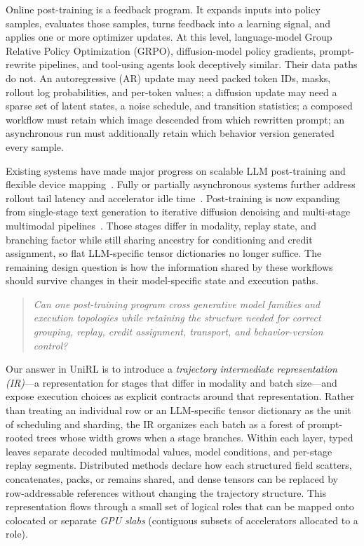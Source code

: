 \documentclass[10pt]{article}
\begin{document}
Online post-training is a feedback program.
It expands inputs into policy samples, evaluates those samples, turns feedback into a learning signal, and applies one or more optimizer updates.
At this level, language-model Group Relative Policy Optimization (GRPO), diffusion-model policy gradients, prompt-rewrite pipelines, and tool-using agents look deceptively similar.
Their data paths do not.
An autoregressive (AR) update may need packed token IDs, masks, rollout log probabilities, and per-token values; a diffusion update may need a sparse set of latent states, a noise schedule, and transition statistics; a composed workflow must retain which image descended from which rewritten prompt; an asynchronous run must additionally retain which behavior version generated every sample.

Existing systems have made major progress on scalable LLM post-training and flexible device mapping~\citep{sheng2024hybridflow,hu2024openrlhf,wang2025roll,nemorl2025}.
Fully or partially asynchronous systems further address rollout tail latency and accelerator idle time~\citep{fu2025areal,zhang2026relax,slime2025}.
Post-training is now expanding from single-stage text generation to iterative diffusion denoising and multi-stage multimodal pipelines~\citep{black2023ddpo,liu2025flowgrpo,xue2025dancegrpo,zheng2025diffusionnft,verlomni2026}.
Those stages differ in modality, replay state, and branching factor while still sharing ancestry for conditioning and credit assignment, so flat LLM-specific tensor dictionaries no longer suffice.
The remaining design question is how the information shared by these workflows should survive changes in their model-specific state and execution paths.

\begin{quote}
\emph{Can one post-training program cross generative model families and execution topologies while retaining the structure needed for correct grouping, replay, credit assignment, transport, and behavior-version control?}
\end{quote}

Our answer in UniRL is to introduce a \emph{trajectory intermediate representation (IR)}---a representation for stages that differ in modality and batch size---and expose execution choices as explicit contracts around that representation.
Rather than treating an individual row or an LLM-specific tensor dictionary as the unit of scheduling and sharding, the IR organizes each batch as a forest of prompt-rooted trees whose width grows when a stage branches.
Within each layer, typed leaves separate decoded multimodal values, model conditions, and per-stage replay segments.
Distributed methods declare how each structured field scatters, concatenates, packs, or remains shared, and dense tensors can be replaced by row-addressable references without changing the trajectory structure.
This representation flows through a small set of logical roles that can be mapped onto colocated or separate \emph{GPU slabs} (contiguous subsets of accelerators allocated to a role).
\end{document}
